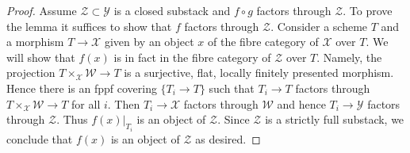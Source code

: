 \documentclass[10pt,a4paper]{amsart}
\theoremstyle{plain}
\theoremstyle{definition}
\theoremstyle{remark}
\numberwithin{equation}{subsection}
\begin{document}
\begin{proof}
Assume $\mathcal{Z} \subset \mathcal{Y}$
is a closed substack and $f \circ g$ factors through $\mathcal{Z}$.
To prove the lemma it suffices to show
that $f$ factors through $\mathcal{Z}$.
Consider a scheme $T$ and a morphism $T \to \mathcal{X}$
given by an object $x$ of the fibre category of $\mathcal{X}$ over $T$.
We will show that $f(x)$ is in fact in the fibre category of $\mathcal{Z}$
over $T$. Namely, the projection $T \times_\mathcal{X} \mathcal{W} \to T$
is a surjective, flat, locally finitely presented morphism.
Hence there is an fppf covering $\{T_i \to T\}$ such that
$T_i \to T$ factors through $T \times_\mathcal{X} \mathcal{W} \to T$
for all $i$. Then $T_i \to \mathcal{X}$ factors through $\mathcal{W}$
and hence $T_i \to \mathcal{Y}$ factors through $\mathcal{Z}$.
Thus $f(x)|_{T_i}$ is an object of $\mathcal{Z}$.
Since $\mathcal{Z}$ is a strictly full substack, we conclude
that $f(x)$ is an object of $\mathcal{Z}$ as desired.
\end{proof}
\end{document}

